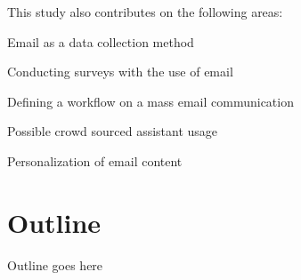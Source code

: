This study also contributes on the following areas:

\begin{compactenum}
	\item Email as a data collection method
	\item Conducting surveys with the use of email
	\item Defining a workflow on a mass email communication
	\item Possible crowd sourced assistant usage
	\item Personalization of email content
\end{compactenum}


\begin{comment}


--> We use email also more daily communication, onlar bize soru soruyor iletisim olusuyor.

(paper E21 p 442, and E5)To date, researchers have used Web page-based surveys to study large groups of on-line users (e.g. Kehoe, Pitkow and Morton, 1997) and e-mail surveys to study smaller, more homogenous on-line user groups (e.g. Parker, 1992; Smith, 1997; Tse et al, 1995). However, it appears that a relatively untapped use for the Internet is to use e-mail is to survey broader Internet populations on both a national and international basis. WRITE the problems in here as well form that paper. Problems related from researchers perspective. Also mention briefly about the purpose and design of the those surveys.


Reaching out large-scale of people via internet is a fast and cost efficient way comparing with postal mail or telephone. Therefore, email has been used not just for research, but also for marketing, customer support, and other data collection purposes. However, getting an acceptable response rates on the sent out emails requires additional efforts from the researchers' side. This thesis investigates a communication system which contributes increasing the response rates while minimizing the burden on the researchers' side. 

As aforementioned studies showed that different forms of personalization increase the response rates in email communication. However, it has become very easy to add personalized information into email thanks to the softwares. Dillman, et al. (2009) stated that over-personalization using software tools might easily result impersonal messages.

Moreover, experienced email users can identify if a message is written by a person or computer generated by looking appearance of one's name in certain locations, and similar patterns for other information \citep[page 272]{DillmanDonA.SmythJoleneD.Christian2009}. Therefore, it becomes difficult to have a correct amount and tone of personalization. The more daily interaction with digital devices will make the true authentic personalization more rare, hence achieving it will make it more important and effective \citep[page 238]{DillmanDonA.SmythJoleneD.Christian2009}.

\end{comment}

\section{Outline}
\label{sec:3:Outline}
Outline goes here

